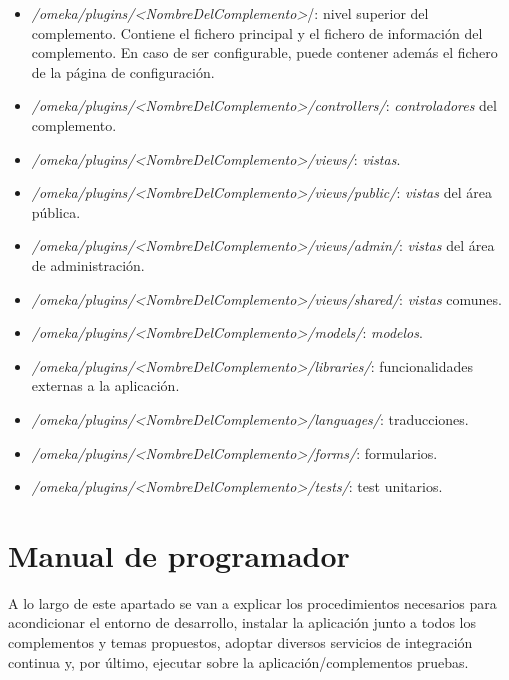 \documentclass[
]{article}
\providecommand{\tightlist}{%
  \setlength{\itemsep}{0pt}\setlength{\parskip}{0pt}}
\begin{document}
\begin{itemize}
\tightlist
\item
  \emph{/omeka/plugins/\textless NombreDelComplemento\textgreater{}}/:
  nivel superior del complemento. Contiene el fichero principal y el
  fichero de información del complemento. En caso de ser configurable,
  puede contener además el fichero de la página de configuración.
\item
  \emph{/omeka/plugins/\textless NombreDelComplemento\textgreater/controllers/}:
  \emph{controladores} del complemento.
\item
  \emph{/omeka/plugins/\textless NombreDelComplemento\textgreater/views/}:
  \emph{vistas}.
\item
  \emph{/omeka/plugins/\textless NombreDelComplemento\textgreater/views/public/}:
  \emph{vistas} del área pública.
\item
  \emph{/omeka/plugins/\textless NombreDelComplemento\textgreater/views/admin/}:
  \emph{vistas} del área de administración.
\item
  \emph{/omeka/plugins/\textless NombreDelComplemento\textgreater/views/shared/}:
  \emph{vistas} comunes.
\item
  \emph{/omeka/plugins/\textless NombreDelComplemento\textgreater/models/}:
  \emph{modelos}.
\item
  \emph{/omeka/plugins/\textless NombreDelComplemento\textgreater/libraries/}:
  funcionalidades externas a la aplicación.
\item
  \emph{/omeka/plugins/\textless NombreDelComplemento\textgreater/languages/}:
  traducciones.
\item
  \emph{/omeka/plugins/\textless NombreDelComplemento\textgreater/forms/}:
  formularios.
\item
  \emph{/omeka/plugins/\textless NombreDelComplemento\textgreater/tests/}:
  test unitarios.
\end{itemize}

\hypertarget{manual-de-programador}{%
\section{Manual de programador}\label{manual-de-programador}}

A lo largo de este apartado se van a explicar los procedimientos
necesarios para acondicionar el entorno de desarrollo, instalar la
aplicación junto a todos los complementos y temas propuestos, adoptar
diversos servicios de integración continua y, por último, ejecutar sobre
la aplicación/complementos pruebas.
\end{document}
